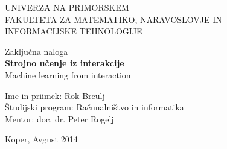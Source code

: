 \documentclass[a4paper, oneside, 12pt]{report}
\begin{document}
\begin{titlepage}
\begin{center}
\begin{large}
UNIVERZA NA PRIMORSKEM\\
FAKULTETA ZA MATEMATIKO, NARAVOSLOVJE IN\\
INFORMACIJSKE TEHNOLOGIJE\\[6cm]
\end{large}
\end{center}

\begin{center}
Zaključna naloga\\
\textbf{\large Strojno učenje iz interakcije}\\
Machine learning from interaction\\[6cm]
\end{center}

\noindent
Ime in priimek: Rok Breulj\\
Študijski program: Računalništvo in informatika\\
Mentor: doc. dr. Peter Rogelj\\

\vfill
\begin{center}
{\large Koper, Avgust 2014}
\end{center}
\end{titlepage}

\end{document}
